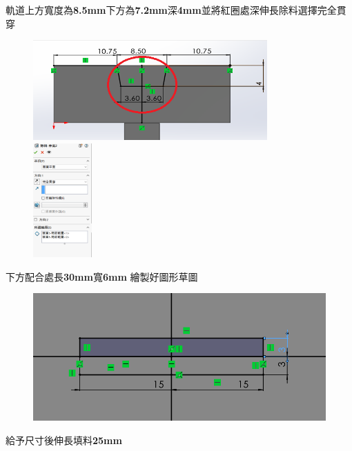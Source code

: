 \noindent 軌道上方寬度為\textbf{8.5mm}下方為\textbf{7.2mm}深\textbf{4mm}並將紅圈處深伸長除料選擇完全貫穿

\begin{figure}[h!]
    \centering
    \includegraphics[width=0.8\textwidth]{./../images/6-1-13.png}
    \includegraphics[width=0.2\textwidth]{./../images/6-1-14.png}
\end{figure}

\noindent 下方配合處長\textbf{30mm}寬\textbf{6mm} 繪製好圖形草圖

\begin{figure}[h!]
    \centering
    \includegraphics[width=1\textwidth]{./../images/6-1-15.png}
\end{figure}

\noindent 給予尺寸後伸長填料\textbf{25mm}

